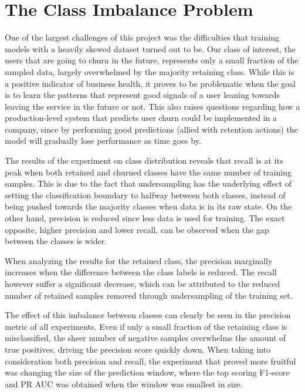 \documentclass{kththesis}
\begin{document}
\section{The Class Imbalance Problem}
\label{sec:dis_class_dist}

One of the largest challenges of this project was the difficulties that training models with a heavily skewed dataset turned out to be. Our class of interest, the users that are going to churn in the future, represents only a small fraction of the sampled data, largely overwhelmed by the majority retaining class. While this is a positive indicator of business health, it proves to be problematic when the goal is to learn the patterns that represent good signals of a user leaning towards leaving the service in the future or not. This also raises questions regarding how a production-level system that predicts user churn could be implemented in a company, since by performing good predictions (allied with retention actions) the model will gradually lose performance as time goes by.

The results of the experiment on class distribution reveals that recall is at its peak when both retained and churned classes have the same number of training samples. This is due to the fact that undersampling has the underlying effect of setting the classification boundary to halfway between both classes, instead of being pushed towards the majority classes when data is in its raw state. On the other hand, precision is reduced since less data is used for training. The exact opposite, higher precision and lower recall, can be observed when the gap between the classes is wider.

When analyzing the results for the retained class, the precision marginally increases when the difference between the class labels is reduced. The recall however suffer a significant decrease, which can be attributed to the reduced number of retained samples removed through undersampling of the training set.

The effect of this imbalance between classes can clearly be seen in the precision metric of all experiments. Even if only a small fraction of the retaining class is misclassified, the sheer number of negative samples overwhelms the amount of true positives, driving the precision score quickly down. When taking into consideration both precision and recall, the experiment that proved more fruitful was changing the size of the prediction window, where the top scoring F1-score and PR AUC was obtained when the window was smallest in size. 
\end{document}
